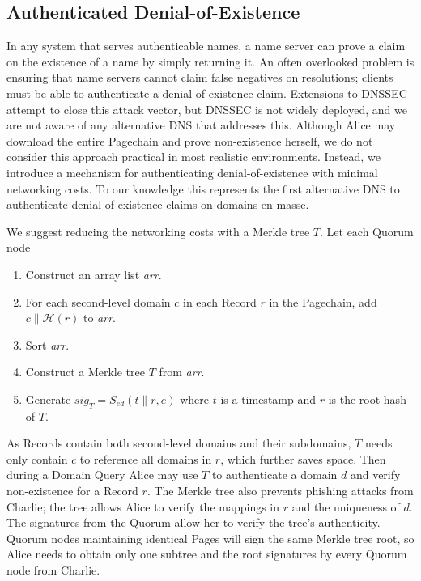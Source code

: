 \documentclass[conference]{IEEEtran}
\newcommand*\concat{\mathbin{\|}}
\begin{document}
\subsection{Authenticated Denial-of-Existence}
\label{sec:authDenial}

In any system that serves authenticable names, a name server can prove a claim on the existence of a name by simply returning it. An often overlooked problem is ensuring that name servers cannot claim false negatives on resolutions; clients must be able to authenticate a denial-of-existence claim. Extensions to DNSSEC attempt to close this attack vector, but DNSSEC is not widely deployed, and we are not aware of any alternative DNS that addresses this. Although Alice may download the entire Pagechain and prove non-existence herself, we do not consider this approach practical in most realistic environments. Instead, we introduce a mechanism for authenticating denial-of-existence with minimal networking costs. To our knowledge this represents the first alternative DNS to authenticate denial-of-existence claims on domains en-masse.

We suggest reducing the networking costs with a Merkle tree \cite{merkle1988digital} $ T $. Let each Quorum node

\begin{enumerate}
	\item Construct an array list \emph{arr}.
	\item For each second-level domain $ c $ in each Record $ r $ in the Pagechain, add $ c \concat \mathcal{H}(r) $ to \emph{arr}.
	\item Sort \emph{arr}.
	\item Construct a Merkle tree $ T $ from \emph{arr}.
	\item Generate $ \mathit{sig}_{T} = S_{\mathit{ed}}(t \concat r, e) $ where $ t $ is a timestamp and $ r $ is the root hash of $ T $.
\end{enumerate}

As Records contain both second-level domains and their subdomains, $ T $ needs only contain $ c $ to reference all domains in $ r $, which further saves space. Then during a Domain Query Alice may use $ T $ to authenticate a domain $ d $ and verify non-existence for a Record $ r $. The Merkle tree also prevents phishing attacks from Charlie; the tree allows Alice to verify the mappings in $ r $ and the uniqueness of $ d $. The signatures from the Quorum allow her to verify the tree's authenticity. Quorum nodes maintaining identical Pages will sign the same Merkle tree root, so Alice needs to obtain only one subtree and the root signatures by every Quorum node from Charlie.
\end{document}
